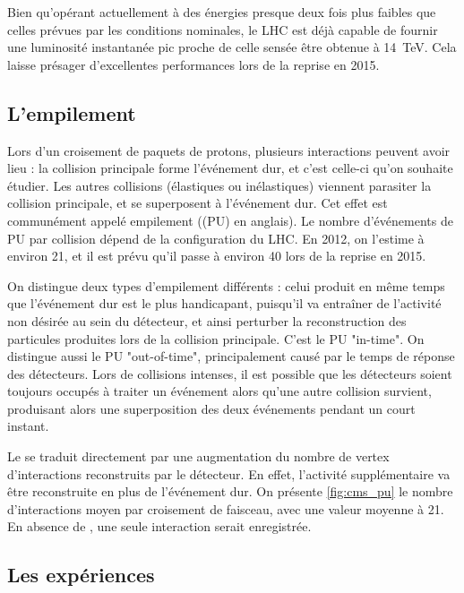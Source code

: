 \bigskip

Bien qu'opérant actuellement à des énergies presque deux fois plus faibles que celles prévues par les conditions nominales, le LHC est déjà capable de fournir une luminosité instantanée pic proche de celle sensée être obtenue à \SI{14}{\TeV}. Cela laisse présager d'excellentes performances lors de la reprise en 2015.

\subsection{L'empilement} \label{sec:pileup}

Lors d'un croisement de paquets de protons, plusieurs interactions \Pproton{}\Pproton{} peuvent avoir lieu : la collision principale forme l'événement dur, et c'est celle-ci qu'on souhaite étudier. Les autres collisions (élastiques ou inélastiques) viennent parasiter la collision principale, et se superposent à l'événement dur. Cet effet est communément appelé empilement (\pu (PU) en anglais). Le nombre d'événements de PU par collision dépend de la configuration du LHC. En 2012, on l'estime à environ 21, et il est prévu qu'il passe à environ 40 lors de la reprise en 2015.

\medskip

On distingue deux types d'empilement différents : celui produit en même temps que l'événement dur est le plus handicapant, puisqu'il va entraîner de l'activité non désirée au sein du détecteur, et ainsi perturber la reconstruction des particules produites lors de la collision principale. C'est le PU "in-time". On distingue aussi le PU "out-of-time", principalement causé par le temps de réponse des détecteurs. Lors de collisions intenses, il est possible que les détecteurs soient toujours occupés à traiter un événement alors qu'une autre collision survient, produisant alors une superposition des deux événements pendant un court instant.

\medskip

Le \pu se traduit directement par une augmentation du nombre de vertex d'interactions reconstruits par le détecteur. En effet, l'activité supplémentaire va être reconstruite en plus de l'événement dur. On présente \cref{fig:cms_pu} le nombre d'interactions moyen par croisement de faisceau, avec une valeur moyenne à 21. En absence de \pu, une seule interaction serait enregistrée.

\subsection{Les expériences}

